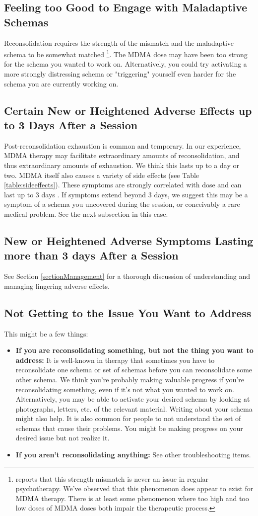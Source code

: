 \documentclass[12pt,letterpaper]{book}
\begin{document}
\subsection*{Feeling too Good to Engage with Maladaptive Schemas}
Reconsolidation requires the strength of the mismatch and the maladaptive schema to be somewhat matched \cite{eckerUnlocking}\footnote{\textcite{eckerUnlocking} reports that this strength-mismatch is never an issue in regular psychotherapy. We've observed that this phenomenon does appear to exist for MDMA therapy. There is at least some phenomenon where too high and too low doses of MDMA doses both impair the therapeutic process.}. The MDMA dose may have been too strong for the schema you wanted to work on. Alternatively, you could try activating a more strongly distressing schema or "triggering" yourself even harder for the schema you are currently working on.
\subsection*{Certain New or Heightened Adverse Effects up to 3 Days After a Session}
Post-reconsolidation exhaustion is common and temporary. In our experience, MDMA therapy may facilitate extraordinary amounts of reconsolidation, and thus extraordinary amounts of exhaustion. We think this lasts up to a day or two. MDMA itself also causes a variety of side effects (see Table \ref{table:sideeffects}). These symptoms are strongly correlated with dose and can last up to 3 days \cite{liechtiGender}. If symptoms extend beyond 3 days, we suggest this may be a symptom of a schema you uncovered during the session, or conceivably a rare medical problem. See the next subsection in this case.
\subsection*{New or Heightened Adverse Symptoms Lasting more than 3 days After a Session}
See Section \ref{sectionManagement} for a thorough discussion of understanding and managing lingering adverse effects.
\subsection*{Not Getting to the Issue You Want to Address}
This might be a few things:
\begin{itemize}
    \item \textbf{If you are reconsolidating something, but not the thing you want to address:} It is well-known in therapy that sometimes you have to reconsolidate one schema or set of schemas before you can reconsolidate some other schema. We think you're probably making valuable progress if you're reconsolidating something, even if it's not what you wanted to work on. Alternatively, you may be able to activate your desired schema by looking at photographs, letters, etc. of the relevant material. Writing about your schema might also help. It is also common for people to not understand the set of schemas that cause their problems. You might be making progress on your desired issue but not realize it.
    \item \textbf{If you aren't reconsolidating anything:} See other troubleshooting items.
\end{itemize}
\end{document}
